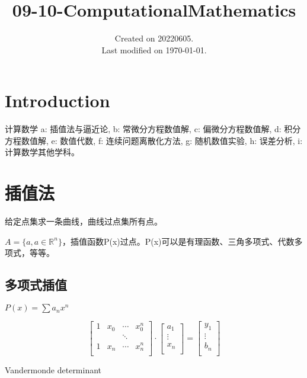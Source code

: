 \documentclass[UTF8]{../09-Mathematics}
\begin{document}
\title{09-10-ComputationalMathematics}
\date{Created on 20220605.\\   Last modified on \today.}
\maketitle
\tableofcontents


\chapter{Introduction}
计算数学
a: 插值法与逼近论, 
b: 常微分方程数值解, 
c: 偏微分方程数值解, 
d: 积分方程数值解, 
e: 数值代数, 
f: 连续问题离散化方法, 
g: 随机数值实验, 
h: 误差分析, 
i: 计算数学其他学科。

\chapter{插值法}
给定点集求一条曲线，曲线过点集所有点。

$A = \{a, a\in \mathbb R^n\}$，插值函数P(x)过点。P(x)可以是有理函数、三角多项式、代数多项式，等等。

\section{多项式插值}
$P(x) = \sum a_n x^n$

\begin{equation}
    \begin{bmatrix}
       1 & x_0 & \cdots & x_0^n\\
       & & \ddots & \\
       1 & x_n & \cdots & x_n^n\\
    \end{bmatrix}
    \cdot
    \begin{bmatrix}
      a_1 \\
      \vdots \\
      x_n \\
    \end{bmatrix}
    =
    \begin{bmatrix}
      y_1 \\
      \vdots \\
      b_n \\
    \end{bmatrix}
\end{equation}

  Vandermonde determinant 
\end{document}
